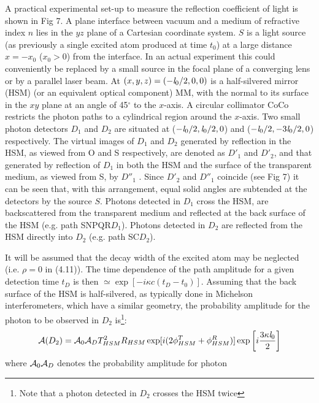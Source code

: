 \documentclass [12pt]{article}
\begin{document}
{ A practical experimental set-up to measure the reflection coefficient of light is shown in Fig 7. A plane
 interface between vacuum and a medium of refractive index $n$ lies in the $yz$ plane of a
  Cartesian coordinate system. $S$ is a light source (as previously a single excited atom 
  produced at time $t_0$) at a large distance $x = -x_0$ ($x_0 > 0$) from the interface.
  In an actual experiment this could conveniently be replaced by a small source in the focal plane of a converging
  lens or by a parallel laser beam.
  At $(x,y,z)= (-{\it l}_0/2, 0, 0)$ is a half-silvered mirror (HSM) (or an equivalent optical
  component) MM, with the normal to its surface in the $xy$ plane at an angle of 45$^{\circ}$ to the $x$-axis.
  A circular collimator CoCo  restricts the photon paths to a cylindrical region around the $x$-axis. Two small photon
   detectors $D_1$ and $D_2$ are situated at ($-{\it l}_0/2, {\it l}_0/2, 0$) and
  ($-{\it l}_0/2, -3{\it l}_0/2, 0$) respectively. The virtual images of $D_1$ and $D_2$ generated by 
  reflection in the HSM, as viewed from O and S respectively,
  are denoted as  $D'_1$ and $D'_2$, and that generated by reflection of $D_1$ 
   in both the HSM and the surface of the transparent medium, as viewed from S, by $D''_1$ .
   Since  $D'_2$ and $D''_1$ coincide
    (see Fig 7)  it can be seen that, with this arrangement,
   equal solid angles are subtended at the detectors by the source $S$. Photons detected in
   $D_1$ cross the HSM, are 
   backscattered from the transparent medium and reflected at the back surface of the HSM (e.g. path SNPQR$D_1$).
   Photons detected in  $D_2$ are reflected from the HSM directly into
   $D_2$ (e.g. path SC$D_2$). 
   \par It will be assumed that the decay width of the excited atom may be neglected (i.e. $\rho = 0$ in
    (4.11)). The time dependence of the path amplitude for a given detection time $t_D$ is then
    $\simeq \exp[-i \kappa c(t_D-t_0)]$. Assuming that the back surface of the HSM is half-silvered, as typically
   done in Michelson interferometers, which have a similar geometry, the probability amplitude for the 
  photon to be observed in $D_2$ is\footnote{Note that a photon detected in $D_2$ crosses the HSM twice}:
   \begin{equation}
   {\cal A}(D_2) = {\cal A}_0 {\cal A}_D T_{HSM}^2 R_{HSM}\exp[i(2\phi_{HSM}^T+\phi_{HSM}^R)]
    \exp\left[i\frac{3 \kappa {\it l}_0}{2}\right]
   \end{equation} 
   where ${\cal A}_0 {\cal A}_D $ denotes the probability amplitude for photon
}
\end{document}
